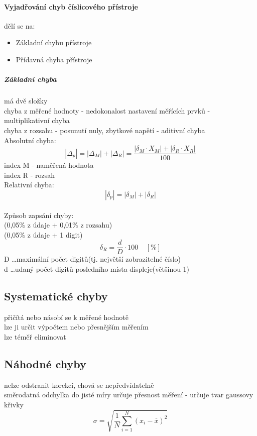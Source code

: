 \paragraph*{Vyjadřování chyb číslicového přístroje}
dělí se na:
\begin{itemize}
    \item Základní chybu přístroje
    \item Přídavná chyba přístroje
\end{itemize}
\subparagraph*{Základní chyba}
má dvě složky \\
chyba z měřené hodnoty - nedokonalost nastavení měřících prvků - multiplikativní chyba\\
chyba z rozsahu - posunutí nuly, zbytkové napětí - aditivní chyba\\
Absolutní chyba:
\begin{equation}
    |\Delta_p| = |\Delta_M| + |\Delta_R| = \frac{|\delta_M \cdot X_M|+|\delta_R \cdot X_R|}{100}
\end{equation}
index M - naměřená hodnota \\
index R - rozsah \\
Relativní chyba:
\begin{equation}
    |\delta_p| = |\delta_M| + |\delta_R| 
\end{equation}
\\
Způsob zapsání chyby:\\
\textpm(0,05\% z údaje + 0,01\% z rozsahu)\\
\textpm(0,05\% z údaje + 1 digit)
\begin{equation}
    \delta_R = \frac{d}{D}\cdot 100 \;\;\;\;[\%]
\end{equation}
D \dots maximální počet digitů(tj. největší zobrazitelné číslo) \\
d \dots udaný počet digitů posledního místa displeje(většinou 1)\\
\subsection*{Systematické chyby}
přičítá nebo násobí se k měřené hodnotě\\
lze ji určit výpočtem nebo přesnějším měřením\\
lze téměř eliminovat\\

\subsection*{Náhodné chyby}
nelze odstranit korekcí, chová se nepředvídatelně\\
směrodatná odchylka do jisté míry určuje přesnost měření - určuje tvar gaussovy křivky
\begin{equation}
    \sigma = \sqrt{\frac{1}{N}\sum^N_{i=1}(x_i-\overline{x})^2}
\end{equation}
\newpage
